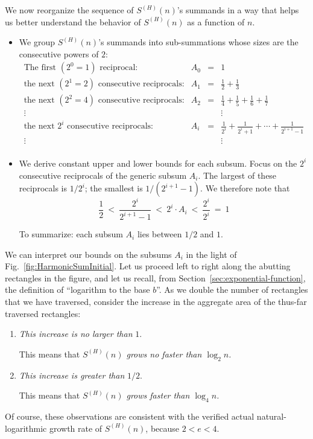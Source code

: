 \medskip

We now reorganize the sequence of $S^{(H)}(n)$'s summands in a way that helps us better understand the behavior of $S^{(H)}(n)$ as a function of $n$.
\begin{itemize}
\item
We group $S^{(H)}(n)$'s summands into sub-summations whose sizes are the consecutive powers of $2$:
\[ \begin{array}{llcl}
\mbox{The first $(2^0 =1)$ reciprocal:} &
A_0 & = &  {\displaystyle 1 } \\[1.01em]
\mbox{the next $(2^1 =2)$ consecutive reciprocals:} &
A_1 & = &  {\displaystyle \frac{1}{2} + \frac{1}{3} }  \\[1.01em]
\mbox{the next $(2^2 =4)$ consecutive reciprocals:} &
A_2 & = &  {\displaystyle \frac{1}{4} + \frac{1}{5} + \frac{1}{6} + \frac{1}{7} } \\
\vdots &  & & \vdots \\
\mbox{the next $2^i$ consecutive reciprocals:} &
A_i & = &  {\displaystyle \frac{1}{2^i} + \frac{1}{2^i+1} + \cdots +
     \frac{1}{2^{i+1}-1}  } \\
\vdots &  & & \vdots \\
\end{array}
\]
\medskip\item
We derive constant upper and lower bounds for each subsum.  Focus on the $2^i$ consecutive reciprocals of the generic subsum $A_i$.  The largest of these reciprocals is $1/2^i$; the smallest is $1/(2^{i+1}-1)$.  We therefore note that
\[
\frac{1}{2}
 \ < \
\frac{2^i}{2^{i+1}-1}
 \ < \
2^i \cdot A_i
  \ < \
\frac{2^i}{2^i}
  \ = \ 1
\]

To summarize: each subsum $A_i$ lies between $1/2$ and $1$.
\end{itemize}

We can interpret our bounds on the subsums $A_i$ in the light of Fig.~\ref{fig:HarmonicSumInitial}.   Let us proceed left to right along the abutting rectangles in the figure, and let us recall, from Section~\ref{sec:exponential-function}, the definition of
``logarithm to the base $b$''.  As we double the number of rectangles that we have traversed, consider the increase in the aggregate area of the thus-far traversed rectangles:
\begin{enumerate}
\item
{\em This increase is no larger than} $1$.

\smallskip

This means that {\em $S^{(H)}(n)$ grows no faster than $\log_2 n$.}

\medskip\item
{\em This increase is greater than} $1/2$.

\smallskip

This means that {\em $S^{(H)}(n)$ grows faster than $\log_4 n$.}
\end{enumerate}
Of course, these observations are consistent with the verified actual natural-logarithmic growth rate of $S^{(H)}(n)$, because $2 < e < 4$.

